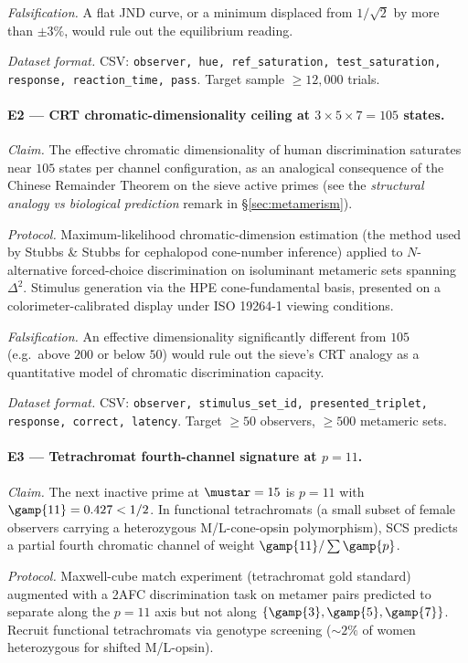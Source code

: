 \documentclass[12pt,a4paper]{article}
\begin{document}
\emph{Falsification.} A flat JND curve, or a minimum displaced from
$1/\sqrt{2}$ by more than $\pm 3\%$, would rule out the equilibrium
reading.

\emph{Dataset format.} CSV: \texttt{observer, hue, ref\_saturation,
test\_saturation, response, reaction\_time, pass}. Target
sample $\geq 12{,}000$ trials.

\paragraph{E2 --- CRT chromatic-dimensionality ceiling at
$3 \times 5 \times 7 = 105$ states.}
\emph{Claim.} The effective chromatic dimensionality of human
discrimination saturates near $105$ states per channel configuration,
as an analogical consequence of the Chinese Remainder Theorem
on the sieve active primes (see the \emph{structural analogy vs
biological prediction} remark in \S\ref{sec:metamerism}).

\emph{Protocol.} Maximum-likelihood chromatic-dimension estimation
(the method used by Stubbs \& Stubbs for cephalopod cone-number
inference) applied to $N$-alternative forced-choice discrimination
on isoluminant metameric sets spanning $\Delta^2$. Stimulus generation
via the HPE cone-fundamental basis, presented on a colorimeter-calibrated
display under ISO 19264-1 viewing conditions.

\emph{Falsification.} An effective dimensionality significantly
different from $105$ (e.g.\ above $200$ or below $50$) would rule out
the sieve's CRT analogy as a quantitative model of chromatic
discrimination capacity.

\emph{Dataset format.} CSV: \texttt{observer, stimulus\_set\_id,
presented\_triplet, response, correct, latency}. Target $\geq 50$
observers, $\geq 500$ metameric sets.

\paragraph{E3 --- Tetrachromat fourth-channel signature at $p = 11$.}
\emph{Claim.} The next inactive prime at $\mustar = 15$ is $p = 11$
with $\gamp{11} = 0.427 < 1/2$. In functional tetrachromats (a small
subset of female observers carrying a heterozygous
M/L-cone-opsin polymorphism), SCS predicts a partial fourth chromatic
channel of weight $\gamp{11}/\sum \gamp{p}$.

\emph{Protocol.} Maxwell-cube match experiment (tetrachromat gold
standard) augmented with a 2AFC discrimination task on metamer pairs
predicted to separate along the $p = 11$ axis but not along
$\{\gamp{3}, \gamp{5}, \gamp{7}\}$. Recruit functional tetrachromats
via genotype screening ($\sim 2\%$ of women heterozygous for shifted
M/L-opsin).
\end{document}
